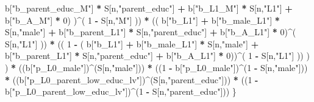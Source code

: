 \documentclass[
]{book}
\newenvironment{Shaded}{\begin{snugshade}}{\end{snugshade}}
\newcommand{\DecValTok}[1]{\textcolor[rgb]{0.00,0.00,0.81}{#1}}
\newcommand{\NormalTok}[1]{#1}
\newcommand{\SpecialCharTok}[1]{\textcolor[rgb]{0.81,0.36,0.00}{\textbf{#1}}}
\newcommand{\StringTok}[1]{\textcolor[rgb]{0.31,0.60,0.02}{#1}}
\begin{document}
\begin{Shaded}
\begin{Highlighting}[]
\NormalTok{                                  b[}\StringTok{"b\_parent\_educ\_M"}\NormalTok{] }\SpecialCharTok{*}\NormalTok{ S[n,}\StringTok{"parent\_educ"}\NormalTok{] }\SpecialCharTok{+} 
\NormalTok{                                  b[}\StringTok{"b\_L1\_M"}\NormalTok{] }\SpecialCharTok{*}\NormalTok{ S[n,}\StringTok{"L1"}\NormalTok{] }\SpecialCharTok{+}
\NormalTok{                                  b[}\StringTok{"b\_A\_M"}\NormalTok{] }\SpecialCharTok{*} \DecValTok{0}\NormalTok{) )}\SpecialCharTok{\^{}}\NormalTok{( }\DecValTok{1} \SpecialCharTok{{-}}\NormalTok{ S[n,}\StringTok{"M"}\NormalTok{] )) }\SpecialCharTok{*}
\NormalTok{                        (( b[}\StringTok{"b\_L1"}\NormalTok{] }\SpecialCharTok{+}
\NormalTok{                             b[}\StringTok{"b\_male\_L1"}\NormalTok{] }\SpecialCharTok{*}\NormalTok{ S[n,}\StringTok{"male"}\NormalTok{] }\SpecialCharTok{+}  
\NormalTok{                             b[}\StringTok{"b\_parent\_L1"}\NormalTok{] }\SpecialCharTok{*}\NormalTok{ S[n,}\StringTok{"parent\_educ"}\NormalTok{] }\SpecialCharTok{+}
\NormalTok{                             b[}\StringTok{"b\_A\_L1"}\NormalTok{] }\SpecialCharTok{*} \DecValTok{0}\NormalTok{)}\SpecialCharTok{\^{}}\NormalTok{( S[n,}\StringTok{"L1"}\NormalTok{] )) }\SpecialCharTok{*}
\NormalTok{                        (( }\DecValTok{1} \SpecialCharTok{{-}}\NormalTok{ ( b[}\StringTok{"b\_L1"}\NormalTok{] }\SpecialCharTok{+}
\NormalTok{                                   b[}\StringTok{"b\_male\_L1"}\NormalTok{] }\SpecialCharTok{*}\NormalTok{ S[n,}\StringTok{"male"}\NormalTok{] }\SpecialCharTok{+}  
\NormalTok{                                   b[}\StringTok{"b\_parent\_L1"}\NormalTok{] }\SpecialCharTok{*}\NormalTok{ S[n,}\StringTok{"parent\_educ"}\NormalTok{] }\SpecialCharTok{+}
\NormalTok{                                   b[}\StringTok{"b\_A\_L1"}\NormalTok{] }\SpecialCharTok{*} \DecValTok{0}\NormalTok{))}\SpecialCharTok{\^{}}\NormalTok{( }\DecValTok{1} \SpecialCharTok{{-}}\NormalTok{ S[n,}\StringTok{"L1"}\NormalTok{] )) ) ) }\SpecialCharTok{*}
\NormalTok{      ((b[}\StringTok{"p\_L0\_male"}\NormalTok{])}\SpecialCharTok{\^{}}\NormalTok{(S[n,}\StringTok{"male"}\NormalTok{])) }\SpecialCharTok{*} 
\NormalTok{      ((}\DecValTok{1} \SpecialCharTok{{-}}\NormalTok{ b[}\StringTok{"p\_L0\_male"}\NormalTok{])}\SpecialCharTok{\^{}}\NormalTok{(}\DecValTok{1} \SpecialCharTok{{-}}\NormalTok{ S[n,}\StringTok{"male"}\NormalTok{])) }\SpecialCharTok{*} 
\NormalTok{      ((b[}\StringTok{"p\_L0\_parent\_low\_educ\_lv"}\NormalTok{])}\SpecialCharTok{\^{}}\NormalTok{(S[n,}\StringTok{"parent\_educ"}\NormalTok{])) }\SpecialCharTok{*}
\NormalTok{      ((}\DecValTok{1} \SpecialCharTok{{-}}\NormalTok{ b[}\StringTok{"p\_L0\_parent\_low\_educ\_lv"}\NormalTok{])}\SpecialCharTok{\^{}}\NormalTok{(}\DecValTok{1} \SpecialCharTok{{-}}\NormalTok{ S[n,}\StringTok{"parent\_educ"}\NormalTok{])) }
\NormalTok{    \}}
  

\end{Highlighting}
\end{Shaded}
\end{document}
